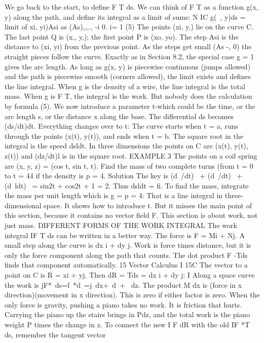 We go back to the start, to define F T ds. We can think of F T as a function g(x, y)
along the path, and define its integral as a limit of sums:
N IC g(~, y)ds = limit of xi, yi)Asi as (As),,,., -i 0.
i= 1 (5)
The points (xi, y,) lie on the curve C. The last point Q is (x,, y,); the first point P is
(xo, yo). The step Asi is the distance to (xi, yi) from the previous point. As the steps
get small (As -, 0) the straight pieces follow the curve. Exactly as in Section 8.2, the
special case g = 1 gives the arc length. As long as g(x, y) is piecewise continuous
(jumps allowed) and the path is piecewise smooth (corners allowed), the limit exists
and defines the line integral.
When g is the density of a wire, the line integral is the total mass. When g is F T,
the integral is the work. But nobody does the calculation by formula (5). We now
introduce a parameter t-which could be the time, or the arc length s, or the distance
x along the base.
The diflerential ds becomes (ds/dt)dt. Everything changes over to t:
The curve starts when t = a, runs through the points (x(t), y(t)), and ends when t = b.
The square root in the integral is the speed dsldt. In three dimensions the points on
C are (x(t), y(t), z(t)) and (dz/dt)l is in the square root.
EXAMPLE 3 The points on a coil spring are (x, y, z) = (cos t, sin t, t). Find the mass
of two complete turns (from t = 0 to t = 44 if the density is p = 4.
Solution The key is (d~/dt)~ + (d~/dt)~ + (d~ldt)~ = sin2t + cos2t + 1 = 2. Thus
dsldt = fi. To find the mass, integrate the mass per unit length which is g = p = 4:
That is a line integral in three-dimensional space. It shows how to introduce t. But
it misses the main point of this section, because it contains no vector field F. This
section is about work, not just mass.
DIFFERENT FORMS OF THE WORK INTEGRAL
The work integral IF T ds can be written in a better way. The force is F = Mi + Nj.
A small step along the curve is dx i + dy j. Work is force times distance, but it is only
the force component along the path that counts. The dot product F -Tds finds that
component automatically. 
15 Vector Calculus
I 15C The vector to a point on C is R = xi + yj. Then dR = Tds = dx i + dy j:
I Along a space curve the work is jF*~ds=f~*d~=j~dx+~d~+ ~dz.
The product M dx is (force in x direction)(movement in x direction). This is zero if
either factor is zero. When the only force is gravity, pushing a piano takes no work.
It is friction that hurts. Carrying the piano up the stairs brings in Pdz, and the total
work is the piano weight P times the change in z.
To connect the new I F dR with the old IF *T ds, remember the tangent vector
